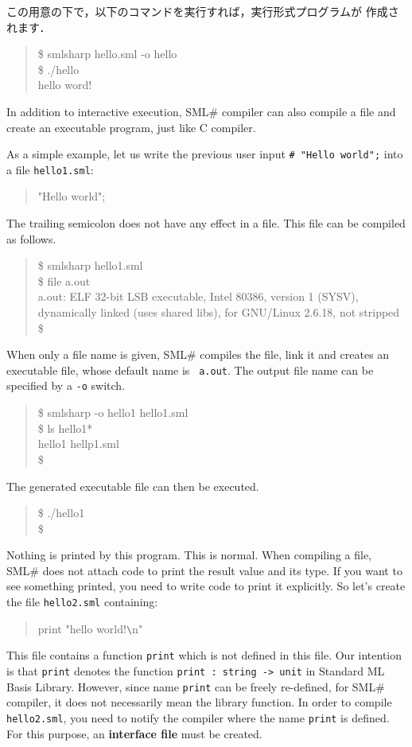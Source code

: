 \documentclass{jbook}
\newcommand{\smlsharp}{SML\#}
\newenvironment{program}{\begin{tt}\begin{quote}}{\end{quote}\end{tt}}
\begin{document}
	この用意の下で，以下のコマンドを実行すれば，実行形式プログラムが
作成されます．
\begin{program}
\$ smlsharp hello.sml -o hello\\
\$ ./hello\\
hello word!
\end{program}
\else%
	In addition to interactive execution, \smlsharp{} compiler can
also compile a file and create an executable program, just like C
compiler.  

	As a simple example, let us write the previous user input
{\tt \# "Hello world";} into a file {\tt hello1.sml}:
\begin{program}
"Hello world";
\end{program}
	The trailing semicolon does not have any effect in a file.
	This file can be compiled as follows.
\begin{program}
\$ smlsharp hello1.sml\\
\$ file a.out\\
a.out: ELF 32-bit LSB executable, Intel 80386, version 1 (SYSV), dynamically linked (uses shared libs), for GNU/Linux 2.6.18, not stripped\\
\$
\end{program}
	When only a file name is given, \smlsharp{} compiles the file,
link it and creates an executable file, whose default name is {\tt
a.out}.
	The output file name can be specified by a {\tt -o} switch.
\begin{program}
\$ smlsharp -o hello1 hello1.sml\\
\$ ls hello1*\\
hello1 hellp1.sml\\
\$ 
\end{program}
	The generated executable file can then be executed.
\begin{program}
\$ ./hello1\\
\$ 
\end{program}
	Nothing is printed by this program.
	This is normal.
	When compiling a file, \smlsharp{} does not attach code to print
the result value and its type.
	If you want to see something printed, you need to write code
to print it explicitly.
	So let's create the file {\tt hello2.sml} containing:
\begin{program}
print "hello world!\verb|\|n"
\end{program}
	This file contains a function {\tt print} which is not defined
in this file.
	Our intention is that {\tt print} denotes the function
{\tt print : string -> unit} in Standard ML Basis Library.
	However, since name {\tt print} can be freely re-defined,
for \smlsharp{} compiler, it does not necessarily mean the  library
function.
	In order to compile {\tt hello2.sml}, you need to notify the
compiler where the name {\tt print} is defined.
	For this purpose, an {\bf interface file} must be created.
\end{document}
